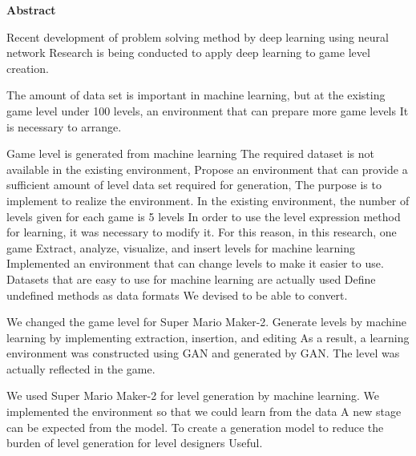 {\huge \textbf{Abstract}  \newline}

Recent development of problem solving method by deep learning using neural network
Research is being conducted to apply deep learning to game level creation.

The amount of data set is important in machine learning, but at the existing game level
under 100 levels, an environment that can prepare more game levels
It is necessary to arrange.

Game level is generated from machine learning
The required dataset is not available in the existing environment,
Propose an environment that can provide a sufficient amount of level data set required for generation,
The purpose is to implement to realize the environment.
In the existing environment, the number of levels given for each game is 5 levels
In order to use the level expression method for learning, it was necessary to modify it.
For this reason, in this research, one game
Extract, analyze, visualize, and insert levels for machine learning
Implemented an environment that can change levels to make it easier to use.
Datasets that are easy to use for machine learning are actually used
Define undefined methods as data formats
We devised to be able to convert.


We changed the game level for Super Mario Maker-2.
Generate levels by machine learning by implementing extraction, insertion, and editing
As a result, a learning environment was constructed using GAN and generated by GAN.
The level was actually reflected in the game.


We  used Super Mario Maker-2 for level generation by machine learning.
We implemented the environment so that we could learn from the data
A new stage can be expected from the model.
To create a generation model to reduce the burden of level generation for level designers
Useful.


